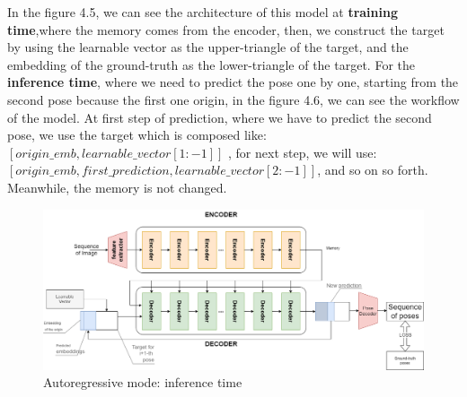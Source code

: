 In the figure 4.5, we can see the architecture of this model at \textbf{training time},where the memory comes from the encoder, then, we construct the target by using the learnable vector as the upper-triangle of the target, and the embedding of the ground-truth as the lower-triangle of the target.
For the \textbf{inference time}, where we need to predict the pose one by one, starting from the second pose because the first one origin, in the figure 4.6, we can see the workflow of the model.
At first step of prediction, where we have to predict the second pose, we use the target which is composed like: $[origin\_emb, learnable\_vector[1\colon-1]]$ , for next step,
we will use: $[origin\_emb, first\_prediction, learnable\_vector[2\colon-1]]$, and so on so forth.
Meanwhile, the memory is not changed.

\begin{figure}[H]
    \centering
    \includegraphics[width=\textwidth]{images/4_1_ar_inference}
    \caption{Autoregressive mode: inference time}\label{fig:figure-auto-regressive-inference}
\end{figure}
